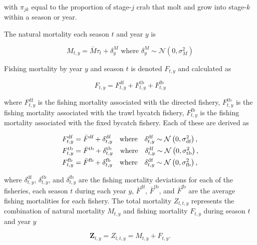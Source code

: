 \documentclass[]{article}
\begin{document}
with \(\pi_{jk}\) equal to the proportion of stage-\(j\) crab that molt
and grow into stage-\(k\) within a season or year.

The natural mortality each season \(t\) and year \(y\) is

\begin{equation}
    M_{t,y} = \bar{M} \tau_t + \delta_y^M \text{ where } \delta_y^M \sim \mathcal{N} \left( 0, \sigma_M^2 \right)
\end{equation}

Fishing mortality by year \(y\) and season \(t\) is denoted \(F_{t,y}\)
and calculated as

\begin{equation}
    F_{t,y} = F_{t,y}^\text{df} + F_{t,y}^\text{tb} + F_{t,y}^\text{fb}
\end{equation}

where \(F_{t,y}^\text{df}\) is the fishing mortality associated with the
directed fishery, \(F_{t,y}^\text{tb}\) is the fishing mortality
associated with the trawl bycatch fishery, \(F_{t,y}^\text{fb}\) is the
fishing mortality associated with the fixed bycatch fishery. Each of
these are derived as

\begin{align}
    F_{t,y}^\text{df} &= \bar{F}^\text{df} + \delta^\text{df}_{t,y} \quad \text{where} \quad \delta^\text{df}_{t,y} \sim \mathcal{N} \left( 0, \sigma^2_\text{df} \right), \notag\\
    F_{t,y}^\text{tb} &= \bar{F}^\text{tb} + \delta^\text{tb}_{t,y} \quad \text{where} \quad \delta^\text{df}_{t,y} \sim \mathcal{N} \left( 0, \sigma^2_\text{tb} \right), \notag\\
    F_{t,y}^\text{fb} &= \bar{F}^\text{fb} + \delta^\text{fb}_{t,y} \quad \text{where} \quad \delta^\text{df}_{t,y} \sim \mathcal{N} \left( 0, \sigma^2_\text{fb} \right),
\end{align}

where \(\delta^\text{df}_{t,y}\), \(\delta^\text{tb}_{t,y}\), and
\(\delta^\text{fb}_{t,y}\) are the fishing mortality deviations for each
of the fisheries, each season \(t\) during each year \(y\),
\(\bar{F}^\text{df}\), \(\bar{F}^\text{tb}\), and \(\bar{F}^\text{fb}\)
are the average fishing mortalities for each fishery. The total
mortality \(Z_{l,t,y}\) represents the combination of natural mortality
\(M_{t,y}\) and fishing mortality \(F_{t,y}\) during season \(t\) and
year \(y\)

\begin{equation}
    \boldsymbol{Z}_{t,y} = Z_{l,t,y} = M_{t,y} + F_{t,y}.
\end{equation}
\end{document}
